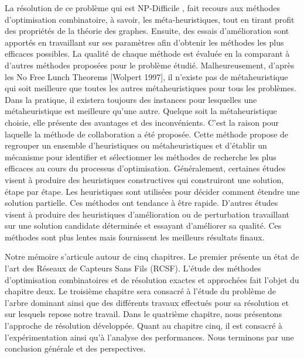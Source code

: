 La résolution de ce problème qui est NP-Difficile \cite{shin2010approximation,zhang2008new} , fait recours aux méthodes d’optimisation combinatoire, à savoir, les méta-heuristiques, tout en tirant profit des propriétés de la théorie des graphes. Ensuite, des essais d'amélioration sont apportés en travaillant sur ses paramètres afin d'obtenir les méthodes les plus efficaces possibles. La qualité de chaque méthode est évaluée en la comparant à d'autres méthodes proposées pour le problème étudié. Malheureusement, d'après les No Free Lunch Theorems [Wolpert 1997], il n'existe pas de métaheuristique qui soit meilleure que toutes les autres métaheuristiques pour tous les problèmes. Dans la pratique, il existera toujours des instances pour lesquelles une métaheuristique est meilleure qu'une autre. Quelque soit la métaheuristique choisie, elle présente des avantages et des inconvénients. C’est la raison pour laquelle la méthode de collaboration a été proposée. Cette méthode propose de regrouper un ensemble d'heuristiques ou métaheuristiques et d'établir un mécanisme pour identifier et sélectionner les méthodes de recherche les plus efficaces au cours du processus d'optimisation. Généralement, certaines études visent à produire des heuristiques constructives qui construiront une solution, étape par étape. Les heuristiques sont utilisées pour décider comment étendre une solution partielle. Ces méthodes ont tendance à être rapide. D'autres études visent à produire des heuristiques d'amélioration ou de perturbation travaillant sur une solution candidate déterminée et essayant d'améliorer sa qualité. Ces méthodes sont plus lentes mais fournissent les meilleurs résultats finaux. 


Notre mémoire s’articule autour de cinq chapitres. Le premier présente un état de l’art des Réseaux de Capteurs Sans Fils (RCSF). L’étude des méthodes d’optimisation combinatoires et de résolution exactes et approchées fait l’objet du chapitre deux. Le troisième chapitre sera consacré à l’étude du problème de l’arbre dominant ainsi que des différents travaux effectués pour sa résolution et sur lesquels repose notre travail. Dans le quatrième chapitre, nous présentons l’approche de résolution développée. Quant au chapitre cinq, il est consacré à l’expérimentation ainsi qu’à l’analyse des
performances. Nous terminons par une conclusion générale et des perspectives.


